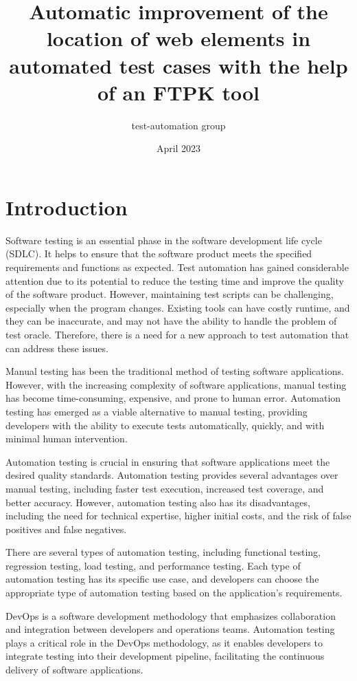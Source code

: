 \documentclass{article}
\title{Automatic improvement of the location of web elements in automated test cases with the help of an FTPK tool}
\author{test-automation group}
\date{April 2023}
\begin{document}
\maketitle

\section{Introduction}

Software testing is an essential phase in the software development life cycle (SDLC). It helps to ensure that the software product meets the specified requirements and functions as expected. Test automation has gained considerable attention due to its potential to reduce the testing time and improve the quality of the software product. However, maintaining test scripts can be challenging, especially when the program changes. Existing tools can have costly runtime, and they can be inaccurate, and may not have the ability to handle the problem of test oracle. Therefore, there is a need for a new approach to test automation that can address these issues.

Manual testing has been the traditional method of testing software applications. However, with the increasing complexity of software applications, manual testing has become time-consuming, expensive, and prone to human error. Automation testing has emerged as a viable alternative to manual testing, providing developers with the ability to execute tests automatically, quickly, and with minimal human intervention.

Automation testing is crucial in ensuring that software applications meet the desired quality standards. Automation testing provides several advantages over manual testing, including faster test execution, increased test coverage, and better accuracy. However, automation testing also has its disadvantages, including the need for technical expertise, higher initial costs, and the risk of false positives and false negatives.

There are several types of automation testing, including functional testing, regression testing, load testing, and performance testing. Each type of automation testing has its specific use case, and developers can choose the appropriate type of automation testing based on the application's requirements.

DevOps is a software development methodology that emphasizes collaboration and integration between developers and operations teams. Automation testing plays a critical role in the DevOps methodology, as it enables developers to integrate testing into their development pipeline, facilitating the continuous delivery of software applications.
\end{document}
